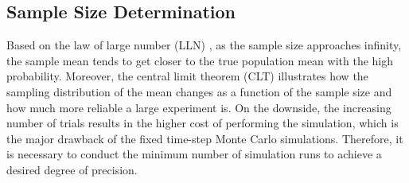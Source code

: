 \subsection{Sample Size Determination}

Based on the law of large number (LLN) \cite{dekking2005modern}, as
the sample size approaches infinity, the sample mean tends to get
closer to the true population mean with the high
probability. Moreover, the central limit theorem (CLT)
\cite{dekking2005modern} illustrates how the sampling distribution of
the mean changes as a function of the sample size and how much more
reliable a large experiment is. On the downside, the increasing number
of trials results in the higher cost of performing the simulation,
which is the major drawback of the fixed time-step Monte Carlo
simulations. Therefore, it is necessary to conduct the minimum number
of simulation runs to achieve a desired degree of precision.
